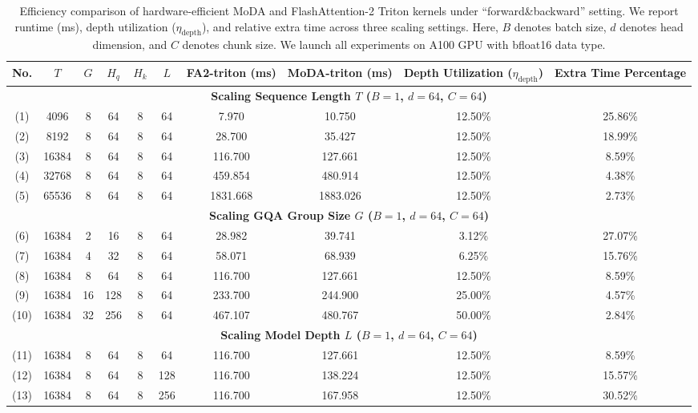 \documentclass[]{bytedance_seed}
\newcommand{\name}{MoDA}
\begin{document}
\begin{table}[t]
    \caption{Efficiency comparison of hardware-efficient \name{} and FlashAttention-2 Triton kernels under ``forward\&backward'' setting.
    We report runtime (ms), depth utilization ($\eta_{\text{depth}}$), and relative extra time across three scaling settings.
    Here, $B$ denotes batch size, $d$ denotes head dimension, and $C$ denotes chunk size.
    We launch all experiments on A100 GPU with bfloat16 data type.}
    \label{tab:moda_hardware_efficiency}
    \centering
    \footnotesize
    \setlength{\tabcolsep}{4pt}
    \begin{tabular}{cccccccccc}
    \toprule
    No. & $T$ & $G$ & $H_q$ & $H_k$ & $L$ & FA2-triton (ms) & \name{}-triton (ms) & Depth Utilization ($\eta_{\text{depth}}$) & Extra Time Percentage \\
    \midrule
    \multicolumn{10}{c}{\bfseries Scaling Sequence Length $T$ ($B{=}1$, $d{=}64$, $C{=}64$)} \\
    \midrule
    (1)  & 4096  & 8  & 64  & 8 & 64  & 7.970    & 10.750   & 12.50\% & 25.86\% \\
    (2)  & 8192  & 8  & 64  & 8 & 64  & 28.700   & 35.427   & 12.50\% & 18.99\% \\
    (3)  & 16384 & 8  & 64  & 8 & 64  & 116.700  & 127.661  & 12.50\% & 8.59\% \\
    (4)  & 32768 & 8  & 64  & 8 & 64  & 459.854  & 480.914  & 12.50\% & 4.38\% \\
    (5)  & 65536 & 8  & 64  & 8 & 64  & 1831.668 & 1883.026 & 12.50\% & 2.73\% \\
    \midrule
    \multicolumn{10}{c}{\bfseries Scaling GQA Group Size $G$ ($B{=}1$, $d{=}64$, $C{=}64$)} \\
    \midrule
    (6)  & 16384 & 2  & 16  & 8 & 64  & 28.982  & 39.741  & 3.12\% & 27.07\% \\
    (7)  & 16384 & 4  & 32  & 8 & 64  & 58.071  & 68.939  & 6.25\% & 15.76\% \\
    (8)  & 16384 & 8  & 64  & 8 & 64  & 116.700 & 127.661 & 12.50\% & 8.59\% \\
    (9)  & 16384 & 16 & 128 & 8 & 64  & 233.700 & 244.900 & 25.00\% & 4.57\% \\
    (10) & 16384 & 32 & 256 & 8 & 64  & 467.107 & 480.767 & 50.00\% & 2.84\% \\
    \midrule
    \multicolumn{10}{c}{\bfseries Scaling Model Depth $L$ ($B{=}1$, $d{=}64$, $C{=}64$)} \\
    \midrule
    (11) & 16384 & 8 & 64 & 8 & 64  & 116.700 & 127.661 & 12.50\% & 8.59\% \\
    (12) & 16384 & 8 & 64 & 8 & 128 & 116.700 & 138.224 & 12.50\% & 15.57\% \\
    (13) & 16384 & 8 & 64 & 8 & 256 & 116.700 & 167.958 & 12.50\% & 30.52\% \\
    \bottomrule
    \end{tabular}
    \end{table}
\end{document}
